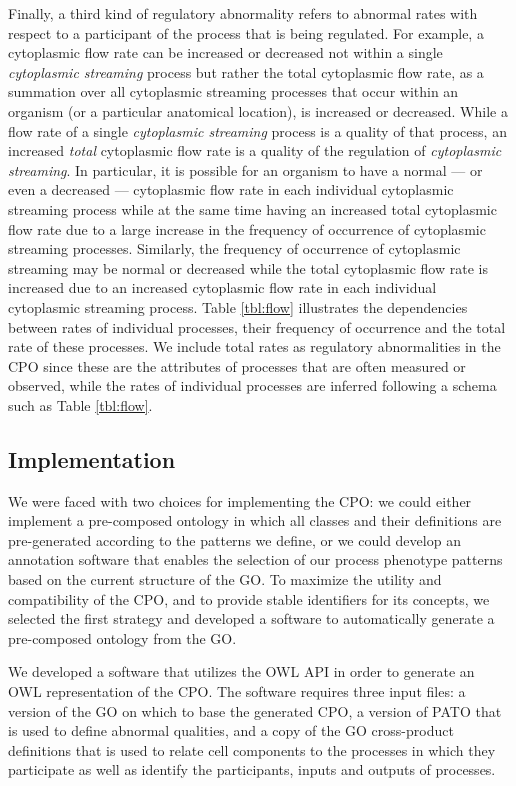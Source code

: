 \documentclass[11pt]{article}
\renewcommand{\cite}{\citep}
\begin{document}
Finally, a third kind of regulatory abnormality refers to abnormal
rates with respect to a participant of the process that is being
regulated. For example, a cytoplasmic flow rate can be increased or
decreased not within a single {\em cytoplasmic streaming} process but
rather the total cytoplasmic flow rate, as a summation over all
cytoplasmic streaming processes that occur within an organism (or a
particular anatomical location), is increased or decreased. While a
flow rate of a single {\em cytoplasmic streaming} process is a quality
of that process, an increased {\em total} cytoplasmic flow rate is a
quality of the regulation of {\em cytoplasmic streaming}. In
particular, it is possible for an organism to have a normal --- or
even a decreased --- cytoplasmic flow rate in each individual
cytoplasmic streaming process while at the same time having an
increased total cytoplasmic flow rate due to a large increase in the
frequency of occurrence of cytoplasmic streaming processes. Similarly,
the frequency of occurrence of cytoplasmic streaming may be normal or
decreased while the total cytoplasmic flow rate is increased due to an
increased cytoplasmic flow rate in each individual cytoplasmic
streaming process. Table \ref{tbl:flow} illustrates the dependencies
between rates of individual processes, their frequency of occurrence
and the total rate of these processes. We include total rates as
regulatory abnormalities in the CPO since these are the attributes of
processes that are often measured or observed, while the rates of
individual processes are inferred following a schema such as Table
\ref{tbl:flow}.

\subsection{Implementation}
We were faced with two choices for implementing the CPO: we could
either implement a pre-composed ontology in which all classes and
their definitions are pre-generated according to the patterns we
define, or we could develop an annotation software that enables the
selection of our process phenotype patterns based on the current
structure of the GO.  To maximize the utility and compatibility of the
CPO, and to provide stable identifiers for its concepts, we selected
the first strategy and developed a software to automatically generate
a pre-composed ontology from the GO.

We developed a software that utilizes the OWL API \cite{Horridge2007}
in order to generate an OWL representation of the CPO. The software
requires three input files: a version of the GO on which to base the
generated CPO, a version of PATO that is used to define abnormal
qualities, and a copy of the GO cross-product definitions
\cite{Mungall2010go} that is used to relate cell components to the
processes in which they participate as well as identify the
participants, inputs and outputs of processes.
\end{document}
